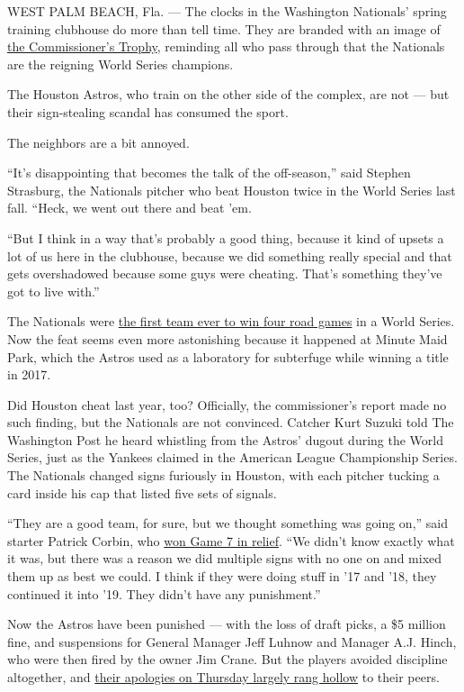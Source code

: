 WEST PALM BEACH, Fla. --- The clocks in the Washington Nationals' spring
training clubhouse do more than tell time. They are branded with an
image of
\href{https://www.nytimes3xbfgragh.onion/interactive/2019/11/02/sports/world-series-trophy.html}{the
Commissioner's Trophy}, reminding all who pass through that the
Nationals are the reigning World Series champions.

The Houston Astros, who train on the other side of the complex, are not
--- but their sign-stealing scandal has consumed the sport.

The neighbors are a bit annoyed.

``It's disappointing that becomes the talk of the off-season,'' said
Stephen Strasburg, the Nationals pitcher who beat Houston twice in the
World Series last fall. ``Heck, we went out there and beat 'em.

``But I think in a way that's probably a good thing, because it kind of
upsets a lot of us here in the clubhouse, because we did something
really special and that gets overshadowed because some guys were
cheating. That's something they've got to live with.''

The Nationals were
\href{https://www.nytimes3xbfgragh.onion/2019/10/30/sports/baseball/world-series-home-teams.html}{the
first team ever to win four road games} in a World Series. Now the feat
seems even more astonishing because it happened at Minute Maid Park,
which the Astros used as a laboratory for subterfuge while winning a
title in 2017.

Did Houston cheat last year, too? Officially, the commissioner's report
made no such finding, but the Nationals are not convinced. Catcher Kurt
Suzuki told The Washington Post he heard whistling from the Astros'
dugout during the World Series, just as the Yankees claimed in the
American League Championship Series. The Nationals changed signs
furiously in Houston, with each pitcher tucking a card inside his cap
that listed five sets of signals.

``They are a good team, for sure, but we thought something was going
on,'' said starter Patrick Corbin, who
\href{https://www.nytimes3xbfgragh.onion/2019/10/30/sports/nationals-astros-game-7.html}{won
Game 7 in relief}. ``We didn't know exactly what it was, but there was a
reason we did multiple signs with no one on and mixed them up as best we
could. I think if they were doing stuff in '17 and '18, they continued
it into '19. They didn't have any punishment.''

Now the Astros have been punished --- with the loss of draft picks, a
\$5 million fine, and suspensions for General Manager Jeff Luhnow and
Manager A.J. Hinch, who were then fired by the owner Jim Crane. But the
players avoided discipline altogether, and
\href{https://www.nytimes3xbfgragh.onion/2020/02/13/sports/baseball/astros-cheating-apologies.html}{their
apologies on Thursday largely rang hollow} to their peers.


